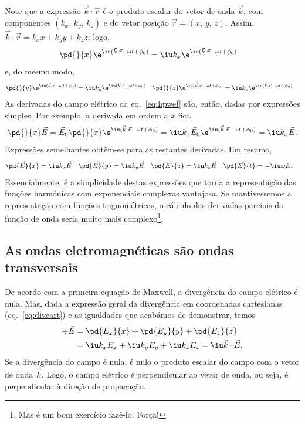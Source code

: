 Note que a expressão $\vec k\cdot\vec r$ é o produto escalar do vetor de onda
$\vec k$, com componentes $(k_x,\,k_y,\,k_z)$ e do vetor posição
$\vec r=(x,\,y,\,z)$. Assim, $\vec k\cdot\vec r=k_xx+k_yy+k_zz$;
logo,
\begin{align*}
  \pd{}{x}\e^{\iu(\vec k\cdot\vec r-\omega t+\phi_0)}&=
  \iu k_x\e^{\iu(\vec k\cdot\vec r-\omega t+\phi_0)}
\end{align*}
e, do mesmo modo,
\begin{align*}
  \pd{}{y}\e^{\iu(\vec k\cdot\vec r-\omega t+\phi_0)}&=
  \iu k_y\e^{\iu(\vec k\cdot\vec r-\omega t+\phi_0)}&
  \pd{}{z}\e^{\iu(\vec k\cdot\vec r-\omega t+\phi_0)}&=
  \iu k_z\e^{\iu(\vec k\cdot\vec r-\omega t+\phi_0)}
\end{align*}
As derivadas do campo elétrico da eq.~\eqref{eq:hpwef} são, então, dadas por
expressões simples. Por exemplo, a derivada em ordem a $x$ fica
\begin{equation*}
  \pd{}{x}\vec E=\vec E_0\pd{}{x}\e^{\iu(\vec k\cdot\vec r-\omega t+\phi_0)}=
  \iu k_x\vec E_0\e^{\iu(\vec k\cdot\vec r-\omega t+\phi_0)}=
  \iu k_x \vec E.
\end{equation*}
Expressões semelhantes obtêm-se para as restantes derivadas. Em resumo,
\begin{align*}
  \pd{\vec E}{x}&=\iu k_x\vec E&
  \pd{\vec E}{y}&=\iu k_y\vec E&
  \pd{\vec E}{z}&=\iu k_z\vec E&
  \pd{\vec E}{t}&=-\iu \omega\vec E.
\end{align*}
Essencialmente, é a simplicidade destas expressões que torna a representação das
funções harmónicas com exponenciais complexas vantajosa. Se mantivessemos a
representação com funções trignométricas, o cálculo das derivadas parciais da
função de onda seria muito mais complexo\footnote{Mas é um bom exercício
fazê-lo.  Força!}.

\subsection{As ondas eletromagnéticas são ondas transversais}
De acordo com a primeira equação de Maxwell, a divergência do campo elétrico é
nula. Mas, dada a expressão geral da divergência em coordenadas cartesianas 
(eq.~\eqref{eq:divcart}) e as igualdades que acabámos de demonstrar, temos
\begin{align*}
  \div\vec E&=\pd{E_x}{x}+\pd{E_y}{y}+\pd{E_z}{z}\\
            &=\iu k_x E_x+\iu k_y E_y+\iu k_z E_z=\iu\vec k\cdot\vec E.
\end{align*}
Se a divergência do campo é nula, é nulo o produto escalar do campo com o vetor
de onda $\vec k$. Logo, o campo elétrico é perpendicular ao vetor de onda, ou
seja, é perpendicular à direção de propagação.

